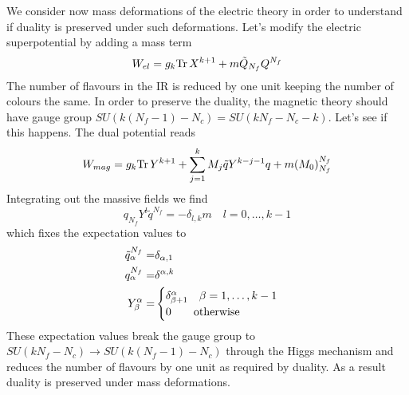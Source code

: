 We consider now mass deformations of the electric theory in order to understand if duality is preserved under such deformations.
Let's modify the electric superpotential by adding a mass term
\begin{equation}
W_{el} =  g_k \mathrm{Tr } \, X^{k+1} + m \tilde{Q}_{N_f} Q^{N_f}
\end{equation}
The number of flavours in the IR is reduced by one unit keeping the number of colours the same. 
In order to preserve the duality, the magnetic theory should have gauge group $SU( k (N_f - 1) - N_c) = SU(k N_f - N_c - k)$.
Let's see if this happens.
The dual potential reads
\begin{equation}
W_{mag} = g_k \mathrm{Tr } \, Y^{k+1} + \sum_{j=1}^k M_j \tilde{q} Y^{k-j-1} q + m (M_0)^{N_f}_{N_f}
\end{equation}
Integrating out the massive fields we find 
\begin{equation}
 q_{N_f} Y^{l} \tilde{q}^{N_f} = - \delta_{l,k} m \quad l=0,\dotsc, k-1
\end{equation}
which fixes the expectation values to
\begin{align}
\tilde{q}_{\alpha}^{N_f} = & \delta_{\alpha,1} \\
q_{\alpha}^{N_f} = & \delta^{\alpha,k}\\
Y^{\alpha}_{\beta} = & 
	\begin{cases}
		\delta_{\beta+1}^{\alpha} \quad \beta = 1 , \dotsc, k-1 \\
		0 \qquad \hbox{otherwise}
	\end{cases}
\end{align}
These expectation values break the gauge group to $SU(k N_f - N_c) \rightarrow SU( k (N_f -1) - N_c) $ through the Higgs mechanism and reduces the number of flavours by one unit as required by duality.
As a result duality is preserved under mass deformations.
